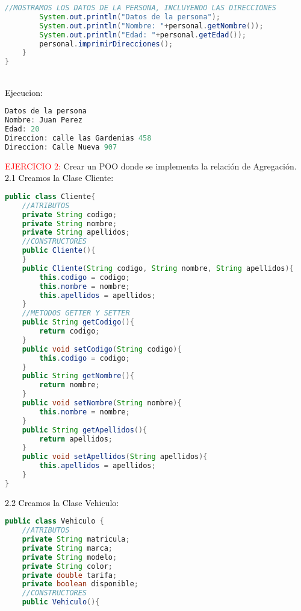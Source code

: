 \documentclass{article}
\begin{document}
\begin{itemize}
\begin{itemize}
\begin{lstlisting}[language=java]
        //MOSTRAMOS LOS DATOS DE LA PERSONA, INCLUYENDO LAS DIRECCIONES
        System.out.println("Datos de la persona");
        System.out.println("Nombre: "+personal.getNombre());
        System.out.println("Edad: "+personal.getEdad());
        personal.imprimirDirecciones();
    } 
}
        \end{lstlisting}
        \newline
        \\
        \textcolor{black}{Ejecucion:} 
		\begin{lstlisting}[language=java]
Datos de la persona
Nombre: Juan Perez
Edad: 20
Direccion: calle las Gardenias 458
Direccion: Calle Nueva 907
        \end{lstlisting}
        \textcolor{red}{EJERCICIO 2:} Crear un POO donde se implementa la relación de Agregación. 
        \newline
        \\
        \textcolor{black}{2.1 Creamos la Clase Cliente: }
        \begin{lstlisting}[language=java]
public class Cliente{
    //ATRIBUTOS
    private String codigo;
    private String nombre;
    private String apellidos;
    //CONSTRUCTORES
    public Cliente(){
    }
    public Cliente(String codigo, String nombre, String apellidos){
        this.codigo = codigo;
        this.nombre = nombre;
        this.apellidos = apellidos;
    }
    //METODOS GETTER Y SETTER
    public String getCodigo(){
        return codigo;
    }
    public void setCodigo(String codigo){
        this.codigo = codigo;
    }
    public String getNombre(){
        return nombre;
    }
    public void setNombre(String nombre){
        this.nombre = nombre;
    }
    public String getApellidos(){
        return apellidos;
    }
    public void setApellidos(String apellidos){
        this.apellidos = apellidos;
    }
}
        \end{lstlisting}
        \textcolor{black}{2.2 Creamos la Clase Vehiculo: }
        \begin{lstlisting}[language=java]
public class Vehiculo {
    //ATRIBUTOS
    private String matricula;
    private String marca;
    private String modelo;
    private String color;
    private double tarifa;
    private boolean disponible;
    //CONSTRUCTORES
    public Vehiculo(){


\end{lstlisting}
\end{itemize}
\end{itemize}
\end{document}
